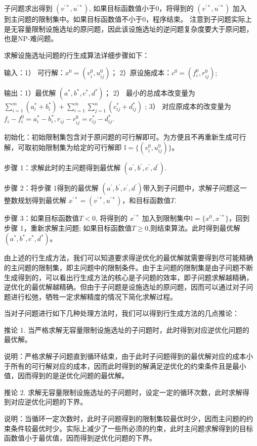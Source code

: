 \documentclass[UTF8]{article}
\begin{document}
子问题求出得到 $(v^{'*},u^{'*})$, 如果目标函数值小于0，将得到的 $(v^{'*},u^{'*})$ 加入到主问题的限制集中。如果目标函数值不小于0，程序结束。
注意到子问题实际上是无容量限制设施选址的原问题，因此该设施选址的逆问题复杂度要大于原问题，也是NP-难问题。

求解设施选址问题的行生成算法详细步骤如下：

输入：1） 可行解：$x^0=(v_i^0,u_{ij}^0)$； 2）原设施成本：$c^0=(f_i^0,r_{ij}^0)$;

输出：1）最优解 $(a^{*},b^{*},c^{*},d^{*})$；
2） 最小的总成本改变量为
$\sum_{i=1}^m(a^{*}_i+b^{*}_i)+\sum_{i=1}^m\sum_{j=1}^n(c^{*}_{ij}+d^{*}_{ij})$ ;
3） 对应原成本的改变量为 $f_i-f_i^0 = a^{*}_i-b^{*}_i,r_{ij}-r_{ij}^0=c^{*}_{ij}-d^{*}_{ij}$.

初始化：初始限制集包含对于原问题的可行解即可。为方便且不再重新生成可行解，可取初始限制集为给定的可行解即 $\mathbb{I} = \{(v_i^0,u_{ij}^0)\} $。

步骤 1：求解此时的主问题得到最优解 $(a^{'},b^{'},c^{'},d^{'})$.

步骤 2：将步骤 1得到的最优解 $(a^{'},b^{'},c^{'},d^{'})$带入到子问题中，求解子问题这一整数规划得到最优解 $x^{'*}=(v^{'*},u^{'*})$，和目标函数值$T$.

步骤 3：如果目标函数值$T< 0$, 将得到的 $x^{'*}$ 加入到限制集中$\mathbb{I} = \{x^0,x^{'*}\}$，回到步骤 1，重新求解主问题;  如果目标函数值$T\geq 0$,则结束算法。此时得到最优解$(a^{*},b^{*},c^{*},d^{*})$。


由上述的行生成方法，我们可以知道要求得逆优化的最优解就需要得到尽可能精确的主问题的限制集，即主问题中的限制条件。由于主问题的限制集是由子问题不断生成得到的，可以看出行生成方法的核心是子问题的效率，即子问题求解越精确，逆优化的最优解越精确。但由于子问题是设施选址的原问题，因而可以通过对子问题进行松弛，牺牲一定求解精度的情况下简化求解过程。

当对子问题进行如下几种处理方法时，我们可以得到行生成方法的几点推论：

推论 1. 当严格求解无容量限制设施选址的子问题时，此时得到对应逆优化问题的最优解。

说明：严格求解子问题直到循环结束，由于此时子问题得到的最优解对应的成本小于所有的可行解对应的成本，因而此时得到的解满足逆优化的约束条件且是最小值，因而得到的是逆优化问题的最优解。

推论 2. 求解无容量限制设施选址的子问题时，设定一定的循环次数，此时求解得到对应逆优化问题的下界。

说明：当循环一定次数时，此时子问题得到的限制集较最优时少，因而主问题的约束条件较最优时少。实际上减少了一些所必须的约束，此时主问题求解得到的目标函数值小于最优值，因而得到逆优化问题的下界。
\end{document}
